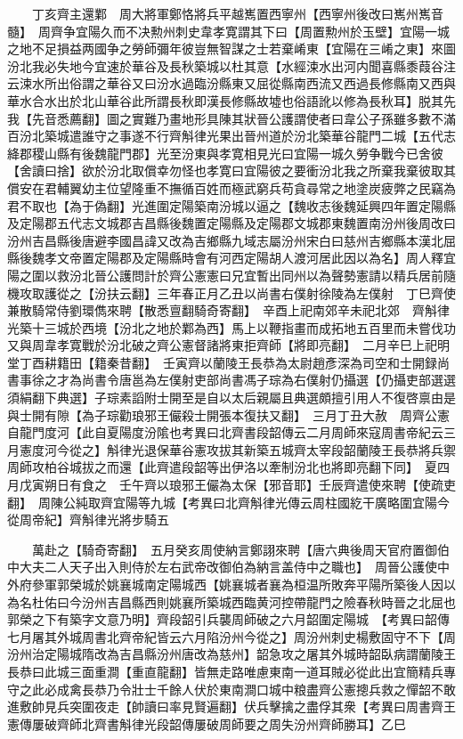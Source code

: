 　　丁亥齊主還鄴　周大將軍鄭恪將兵平越嶲置西寧州【西寧州後改曰嶲州嶲音髓】　周齊争宜陽久而不决勲州刺史韋孝寛謂其下曰【周置勲州於玉壁】宜陽一城之地不足損益两國争之勞師彌年彼豈無智謀之士若棄崤東【宜陽在三崤之東】來圖汾北我必失地今宜速於華谷及長秋築城以杜其意【水經涑水出河内聞喜縣黍葭谷注云涑水所出俗謂之華谷又曰汾水過臨汾縣東又屈從縣南西流又西過長修縣南又西與華水合水出於北山華谷此所謂長秋即漢長修縣故墟也俗語訛以修為長秋耳】脱其先我【先音悉薦翻】圖之實難乃畫地形具陳其狀晉公護謂使者曰韋公子孫雖多數不滿百汾北築城遣誰守之事遂不行齊斛律光果出晉州道於汾北築華谷龍門二城【五代志絳郡稷山縣有後魏龍門郡】光至汾東與孝寛相見光曰宜陽一城久勞争戰今已舍彼【舍讀曰捨】欲於汾北取償幸勿怪也孝寛曰宜陽彼之要衝汾北我之所棄我棄彼取其償安在君輔翼幼主位望隆重不撫循百姓而極武窮兵苟貪尋常之地塗炭疲弊之民竊為君不取也【為于偽翻】光進圍定陽築南汾城以逼之【魏收志後魏延興四年置定陽縣及定陽郡五代志文城郡吉昌縣後魏置定陽縣及定陽郡文城郡東魏置南汾州後周改曰汾州吉昌縣後唐避李國昌諱又改為吉鄉縣九域志屬汾州宋白曰慈州吉鄉縣本漢北屈縣後魏孝文帝置定陽郡及定陽縣時會有河西定陽胡人渡河居此因以為名】周人釋宜陽之圍以救汾北晉公護問計於齊公憲憲曰兄宜暫出同州以為聲勢憲請以精兵居前隨機攻取護從之【汾扶云翻】三年春正月乙丑以尚書右僕射徐陵為左僕射　丁巳齊使兼散騎常侍劉環儁來聘【散悉亶翻騎奇寄翻】　辛酉上祀南郊辛未祀北郊　齊斛律光築十三城於西境【汾北之地於鄴為西】馬上以鞭指畫而成拓地五百里而未嘗伐功又與周韋孝寛戰於汾北破之齊公憲督諸將東拒齊師【將即亮翻】　二月辛巳上祀明堂丁酉耕籍田【籍秦昔翻】　壬寅齊以蘭陵王長恭為太尉趙彥深為司空和士開録尚書事徐之才為尚書令唐邕為左僕射吏部尚書馮子琮為右僕射仍攝選【仍攝吏部選選須絹翻下典選】子琮素謟附士開至是自以太后親屬且典選頗擅引用人不復啓禀由是與士開有隙【為子琮勸琅邪王儼殺士開張本復扶又翻】　三月丁丑大赦　周齊公憲自龍門度河【此自夏陽度汾隂也考異曰北齊書段韶傳云二月周師來寇周書帝紀云三月憲度河今從之】斛律光退保華谷憲攻拔其新築五城齊太宰段韶蘭陵王長恭將兵禦周師攻柏谷城拔之而還【此齊遣段韶等出伊洛以牽制汾北也將即亮翻下同】　夏四月戊寅朔日有食之　壬午齊以琅邪王儼為太保【邪音耶】壬辰齊遣使來聘【使疏吏翻】　周陳公純取齊宜陽等九城【考異曰北齊斛律光傳云周柱國紇干廣略圍宜陽今從周帝紀】齊斛律光將步騎五

　　萬赴之【騎奇寄翻】　五月癸亥周使納言鄭詡來聘【唐六典後周天官府置御伯中大夫二人天子出入則侍於左右武帝改御伯為納言盖侍中之職也】　周晉公護使中外府參軍郭榮城於姚襄城南定陽城西【姚襄城者襄為桓温所敗奔平陽所築後人因以為名杜佑曰今汾州吉昌縣西則姚襄所築城西臨黄河控帶龍門之險春秋時晉之北屈也郭榮之下有築字文意乃明】齊段韶引兵襲周師破之六月韶圍定陽城　【考異曰韶傳七月屠其外城周書北齊帝紀皆云六月陷汾州今從之】周汾州刺史楊敷固守不下【周汾州治定陽城隋改為吉昌縣汾州唐改為慈州】韶急攻之屠其外城時韶臥病謂蘭陵王長恭曰此城三面重澗【重直龍翻】皆無走路唯慮東南一道耳賊必從此出宜簡精兵專守之此必成禽長恭乃令壯士千餘人伏於東南澗口城中粮盡齊公憲摠兵救之憚韶不敢進敷帥見兵突圍夜走【帥讀曰率見賢遍翻】伏兵擊擒之盡俘其衆【考異曰周書齊王憲傳屢破齊師北齊書斛律光段韶傳屢破周師要之周失汾州齊師勝耳】乙巳

